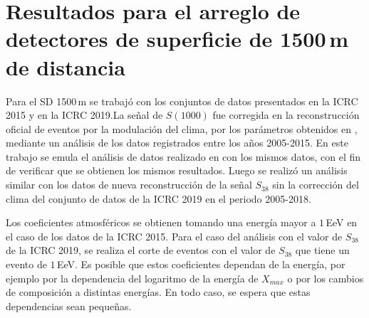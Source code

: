 	\section{Resultados para el arreglo de detectores de superficie de 1500\,m de distancia}

	Para el SD 1500\,m se trabajó con los conjuntos de datos  presentados en la ICRC 2015  y  en la ICRC 2019.La señal de $S(1000)$ fue corregida en la reconstrucción oficial de eventos por la modulación del clima, por los parámetros obtenidos en \cite{aab2017impact}, mediante un análisis de los datos registrados  entre los años 2005-2015. En este trabajo se emula el análisis de datos realizado en \cite{aab2017impact} con los mismos datos, con el fin de verificar que se obtienen los mismos resultados. Luego se realizó un análisis similar con los datos de nueva reconstrucción de la señal $S_{38}$ sin la corrección del clima  del conjunto de datos de la ICRC 2019 en el periodo 2005-2018. %

	Los coeficientes atmosféricos se obtienen tomando una energía mayor a $1\,$EeV en el caso de los datos de la ICRC 2015. Para el caso del análisis con el valor de $S_{38}$ de la ICRC 2019, se realiza el corte de eventos con el valor de $S_{38}$  que tiene un evento de $1\,$EeV. Es posible que estos coeficientes dependan de la energía, por ejemplo por la dependencia del logaritmo de la energía de $X_{max}$ o por los cambios de composición a distintas energías. En todo caso, se espera que estas dependencias sean pequeñas.%

